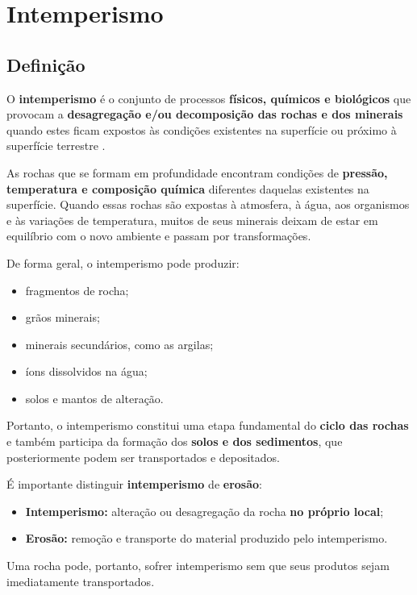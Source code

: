 \section{Intemperismo}

\subsection{Definição}

O \textbf{intemperismo} é o conjunto de processos \textbf{físicos, químicos e biológicos} que provocam a \textbf{desagregação e/ou decomposição das rochas e dos minerais} quando estes ficam expostos às condições existentes na superfície ou próximo à superfície terrestre \parencite{boggs2012,tucker2001}.

As rochas que se formam em profundidade encontram condições de \textbf{pressão, temperatura e composição química} diferentes daquelas existentes na superfície. Quando essas rochas são expostas à atmosfera, à água, aos organismos e às variações de temperatura, muitos de seus minerais deixam de estar em equilíbrio com o novo ambiente e passam por transformações.

De forma geral, o intemperismo pode produzir:

\begin{itemize}
    \item fragmentos de rocha;
    \item grãos minerais;
    \item minerais secundários, como as argilas;
    \item íons dissolvidos na água;
    \item solos e mantos de alteração.
\end{itemize}

Portanto, o intemperismo constitui uma etapa fundamental do \textbf{ciclo das rochas} e também participa da formação dos \textbf{solos e dos sedimentos}, que posteriormente podem ser transportados e depositados.

É importante distinguir \textbf{intemperismo} de \textbf{erosão}:

\begin{itemize}
    \item \textbf{Intemperismo:} alteração ou desagregação da rocha \textbf{no próprio local};
    \item \textbf{Erosão:} remoção e transporte do material produzido pelo intemperismo.
\end{itemize}

Uma rocha pode, portanto, sofrer intemperismo sem que seus produtos sejam imediatamente transportados.

